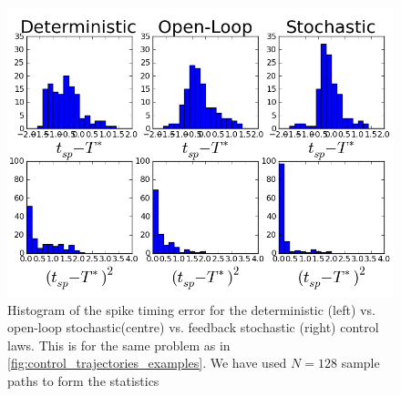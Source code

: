 \documentclass{article}
\begin{document}
\begin{figure}[h]
\begin{center}
  \includegraphics[width=.95\textwidth]
  {Figs/ControlSimulator/3controls_example_trajectories_hists.png}
  \caption[labelInTOC]{Histogram of the spike timing error for the
  deterministic (left) vs. open-loop stochastic(centre) vs. feedback stochastic
  (right) control laws. This is for the same problem as in
  \cref{fig:control_trajectories_examples}. We have used $N=128$ sample paths
  to form the statistics}
  \label{fig:error_histograms_det_vs_openloop_vs_stoch} 
\end{center}
\end{figure}



\end{document}
